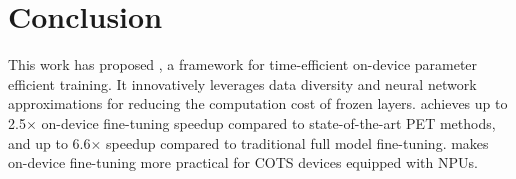 \section{Conclusion}

This work has proposed \sys, a framework for time-efficient on-device parameter efficient training.
It innovatively leverages data diversity and neural network approximations for reducing the computation cost of frozen layers.
\sys achieves up to 2.5$\times$ on-device fine-tuning speedup compared to state-of-the-art PET methods, and up to 6.6$\times$ speedup compared to traditional full model fine-tuning.
\sys makes on-device fine-tuning more practical for COTS devices equipped with NPUs.
